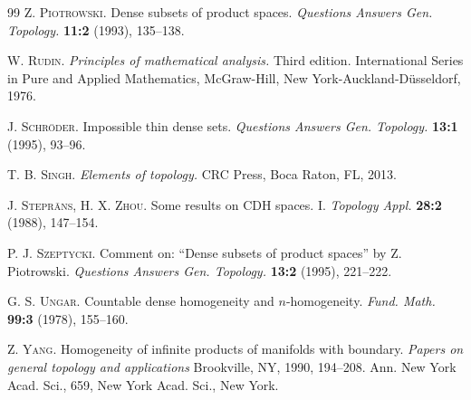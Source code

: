 \documentclass{amsart}
\theoremstyle{plain}
\theoremstyle{definition}
\begin{document}
\begin{thebibliography}{99}
\textsc{Z. Piotrowski.} Dense subsets of product spaces. \textit{Questions Answers Gen. Topology.} \textbf{11:2} (1993), 135--138.

\textsc{W. Rudin.} \textit{Principles of mathematical analysis.} Third edition. International Series in Pure and Applied Mathematics, McGraw-Hill, New York-Auckland-D\"{u}sseldorf, 1976.

\textsc{J. Schr\"{o}der.} Impossible thin dense sets. \textit{Questions Answers Gen. Topology.} \textbf{13:1} (1995), 93--96.

\textsc{T. B. Singh.} \textit{Elements of topology.} CRC Press, Boca Raton, FL, 2013.

\textsc{J. Stepr\={a}ns, H. X. Zhou.} Some results on CDH spaces. I. \textit{Topology Appl.} \textbf{28:2} (1988), 147--154.

\textsc{P. J. Szeptycki.} Comment on: ``Dense subsets of product spaces'' by Z. Piotrowski. \textit{Questions Answers Gen. Topology.} \textbf{13:2} (1995), 221--222.

\textsc{G. S. Ungar.} Countable dense homogeneity and $n$-homogeneity. \textit{Fund. Math.} \textbf{99:3} (1978), 155--160.

\textsc{Z. Yang.} Homogeneity of infinite products of manifolds with boundary. \textit{Papers on general topology and applications} Brookville, NY, 1990, 194--208. Ann. New York Acad. Sci., 659, New York Acad. Sci., New York.

\end{thebibliography}
\end{document}
